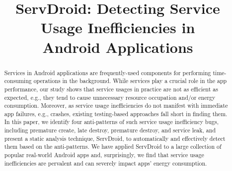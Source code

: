 \documentclass[sigconf,review, anonymous]{acmart}
\begin{document}
\title{ServDroid: Detecting Service Usage Inefficiencies in\\  Android Applications}

\begin{abstract}
Services in Android applications are frequently-used components for performing
time-consuming operations in the background. While services play a crucial role
in the app performance, our study shows that service usages in practice are not
as efficient as expected, e.g., they tend to cause unnecessary resource occupation
and/or energy consumption.
Moreover, as service usage inefficiencies do not manifest
with immediate app failures, e.g., crashes, existing testing-based approaches
fall short in finding them.
In this paper, we identify four anti-patterns of such service usage
inefficiency bugs, including premature create, late destroy, premature destroy,
and service leak, and present a static analysis technique, \textsf{ServDroid},
to automatically and effectively detect them based on the anti-patterns.
We have applied \textsf{ServDroid} to a large collection of popular real-world
Android apps and, surprisingly, we find that service usage inefficiencies are
pervalent and can severely impact apps' energy consumption.
\end{abstract}
\end{document}
